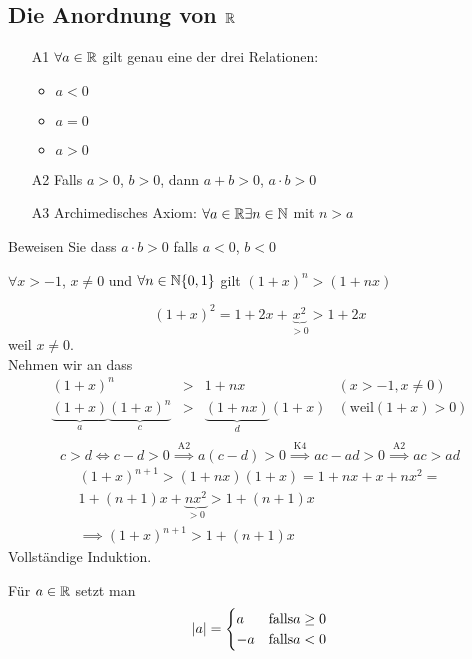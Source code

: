 \subsection{Die Anordnung von $\mathbb{R}$}
\begin{itemize}
  \item[A1] $\forall a\in\mathbb{R}$ gilt genau eine der drei Relationen:
    \begin{itemize}
      \item $a<0$
      \item $a=0$
      \item $a>0$
    \end{itemize}
  \item[A2] Falls $a>0$, $b>0$, dann $a+b>0$, $a\cdot b>0$
  \item[A3] Archimedisches Axiom: $\forall a\in\mathbb{R} \exists n\in\mathbb{N}$ mit $n>a$
\end{itemize}
\begin{Ueb}
  Beweisen Sie dass $a\cdot b>0$ falls $a<0$, $b<0$
\end{Ueb}
\begin{Sat}
  $\forall x>-1$, $x\neq 0$ und $\forall n\in\mathbb{N}\\\{0,1\}$ gilt $(1+x)^n > (1+nx)$
\end{Sat}
\begin{Bew}
  $$(1+x)^2 = 1+2x+\underbrace{x^2}_{>0}>1+2x$$
  weil $x\neq0$.\\
  Nehmen wir an dass
  \begin{align*}
    (1+x)^n&>& 1+nx & (x>-1, x\neq 0)\\
    \underbrace{(1+x)}_a \underbrace{(1+x)^n}_c&>&\underbrace{(1+nx)}_d(1+x) & (\text{weil} (1+x)>0)\\
  \end{align*}
  $$c>d \iff c-d>0 \stackrel{\text{A2}}{\implies} a(c-d) > 0 \stackrel{\text{K4}}{\implies} ac-ad > 0 \stackrel{\text{A2}}{\implies} ac>ad$$
  \begin{align*}
    (1+x)^{n+1} > (1+nx)(1+x) = 1+nx+x+nx^2=\\
    1+(n+1)x+\underbrace{nx^2}_{>0}>1+(n+1)x\\
    \implies (1+x)^{n+1} > 1+(n+1)x
  \end{align*}
  Vollständige Induktion.
\end{Bew}
\begin{Def}
  Für $a\in\mathbb{R}$ setzt man
  \begin{align*}
  \mathopen| a \mathclose|=
    \begin{cases}
      a &\text{falls} a\geq0\\
      -a &\text{falls} a < 0\\
    \end{cases}
  \end{align*}
\end{Def}
